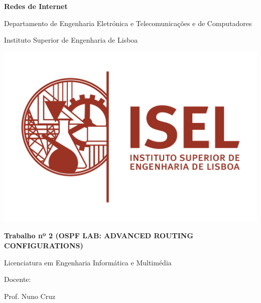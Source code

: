 \documentclass[11pt,english, openright, oneside]{book}
\begin{document}


\renewcommand{\contentsname}{Índice}

\begin{titlepage}
	\clearpage\thispagestyle{empty}
	\centering
	\vspace{1cm}

	{\Large \textbf{Redes de Internet}\par} {\Large Departamento de Engenharia
	Eletrónica e Telecomunicações e de Computadores \par} {\Large Instituto
	Superior de Engenharia de Lisboa \par}
		
	\vspace{0.5cm}
    
    \centering \includegraphics[scale=0.7]{imagens/ISEL.png}

	\vspace{1cm}
	
	{\Huge \textbf{Trabalho nº 2 (OSPF LAB: ADVANCED ROUTING CONFIGURATIONS)}} \\
	\vspace{1cm}

        {\Large Licenciatura em Engenharia Informática e Multimédia}
        
	\vspace{0.5cm}
	
	
	
	
	\begin{center}
	{\normalsize Docente: \par Prof. Nuno Cruz \\
	
}
\end{center}
\end{titlepage}
\end{document}
